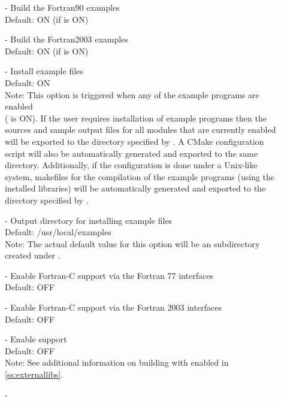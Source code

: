 \begin{description}
\item[] -
  Build the {\sundials} Fortran90 examples
  \\
  Default: ON (if  is ON)
\item[] -
  Build the {\sundials} Fortran2003 examples
  \\
  Default: ON (if  is ON)
\item[] -
  Install example files
  \\
  Default: ON
  \\
  Note: This option is triggered when any of the {\sundials}
  example programs are enabled \\
  ( is ON). If the user requires
  installation of example programs then the sources and sample output files
  for all {\sundials} modules that are currently enabled will be exported to
  the directory specified by . A CMake configuration
  script will also be automatically generated and exported to the same directory.
  Additionally, if the configuration is done under a Unix-like system, makefiles
  for the compilation of the example programs (using the installed {\sundials} libraries)
  will be automatically generated and exported to the directory
  specified by .
\item[] -
  Output directory for installing example files
  \\
  Default: /usr/local/examples
  \\
  Note: The actual default value for this option will be an 
  subdirectory created under .
\item[] -
  Enable Fortran-C support via the Fortran 77 interfaces
  \\
  Default: OFF
\item[] -
  Enable Fortran-C support via the Fortran 2003 interfaces
  \\
  Default: OFF
\item[] -
  Enable {\hypre} support
  \\
  Default: OFF
  \\
  Note: See additional information on building with {\hypre} enabled in
  \ref{ss:externallibs}.
\item[] -

\end{description}
